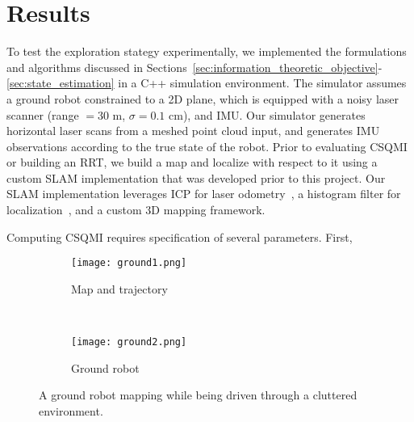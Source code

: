 \section{Results}
\label{sec:results}

To test the exploration stategy experimentally, we implemented the formulations
and algorithms discussed in Sections~\ref{sec:information_theoretic_objective}-\ref{sec:state_estimation}
in a C++ simulation environment. The simulator assumes a ground robot
constrained to a 2D plane, which is equipped with a noisy laser scanner (range $
= 30$ m, $\sigma = 0.1$ cm), and IMU. Our simulator generates horizontal laser scans
from a meshed point cloud input, and generates IMU observations according to the true
state of the robot. Prior to evaluating CSQMI or building an RRT, we build a map
and localize with respect to it using a custom SLAM implementation that was
developed prior to this project. Our SLAM implementation leverages ICP for laser
odometry~\cite{pomerleau2013comparing}, a histogram filter for
localization~\cite{thrun2005probabilistic}, and a custom 3D mapping framework.

Computing CSQMI requires specification of several parameters. First,

\begin{figure*}
  \centering
  \begin{subfigure}{0.47\textwidth}
    \centering
    \texttt{[image: ground1.png]}
    \caption{Map and trajectory\label{fig:ground_bot1}}
  \end{subfigure}
  ~
  \begin{subfigure}{0.47\textwidth}
    \centering
    \texttt{[image: ground2.png]}
    \caption{Ground robot\label{fig:ground_bot2}}
  \end{subfigure}
  \caption{A ground robot mapping while being driven through a cluttered environment.\label{fig:ground_bot}}
\end{figure*}

